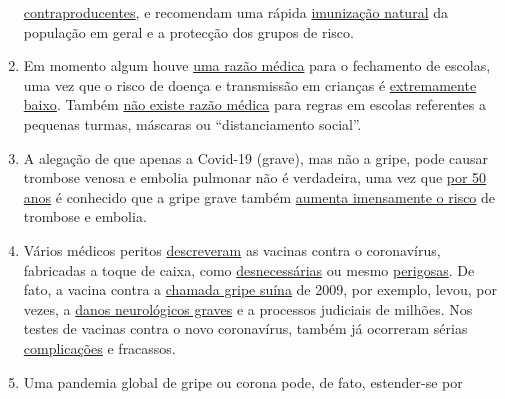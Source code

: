 \begin{enumerate}
  \href{https://off-guardian.org/2020/03/28/10-more-experts-criticising-the-coronavirus-panic/}{contraproducentes},
  e recomendam uma rápida
  \href{https://off-guardian.org/2020/04/17/8-more-experts-questioning-the-coronavirus-panic/}{imunização
  natural} da população em geral e a protecção dos grupos de risco.
\item
  Em momento algum houve
  \href{https://www.thelancet.com/journals/lanchi/article/PIIS2352-4642(20)30095-X/fulltext}{uma
  razão médica} para o fechamento de escolas, uma vez que o risco de
  doença e transmissão em crianças é
  \href{https://thehill.com/opinion/education/500349-science-says-open-the-schools}{extremamente
  baixo}. Também
  \href{https://www.welt.de/politik/deutschland/article208075525/Corona-Kitas-und-Grundschulen-vollstaendig-oeffnen-uneingeschraenkt.html}{não
  existe razão médica} para regras em escolas referentes a pequenas
  turmas, máscaras ou ``distanciamento social''.
\item
  A alegação de que apenas a Covid-19 (grave), mas não a gripe, pode
  causar trombose venosa e embolia pulmonar não é verdadeira, uma vez
  que
  \href{https://www.thieme-connect.com/products/ejournals/abstract/10.1055/s-0028-1108874}{por
  50 anos} é conhecido que a gripe grave também
  \href{https://www.sciencedaily.com/releases/2009/10/091014111549.htm}{aumenta
  imensamente o risco} de trombose e embolia.
\item
  Vários médicos peritos
  \href{https://www.news.com.au/lifestyle/health/health-problems/no-vaccine-for-coronavirus-a-possibility/news-story/34e678ae205b50ea983cc64ab2943608}{descreveram}
  as vacinas contra o coronavírus, fabricadas a toque de caixa, como
  \href{https://www.youtube.com/watch?v=vrL9QKGQrWk}{desnecessárias} ou
  mesmo
  \href{https://www.nature.com/articles/d41586-020-00751-9}{perigosas}.
  De fato, a vacina contra a
  \href{https://www.forbes.com/2010/02/05/world-health-organization-swine-flu-pandemic-opinions-contributors-michael-fumento.html\#658c006c48e8}{chamada
  gripe suína} de 2009, por exemplo, levou, por vezes, a
  \href{https://www.ibtimes.co.uk/brain-damaged-uk-victims-swine-flu-vaccine-get-60-million-compensation-1438572}{danos
  neurológicos graves} e a processos judiciais de milhões. Nos testes de
  vacinas contra o novo coronavírus, também já ocorreram sérias
  \href{https://childrenshealthdefense.org/news/vaccine-trial-catastrophe-moderna-vaccine-has-20-serious-injury-rate-in-high-dose-group/}{complicações}
  e fracassos.
\item
  Uma pandemia global de gripe ou corona pode, de fato, estender-se por

\end{enumerate}
